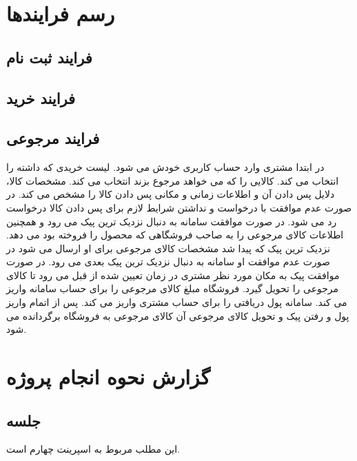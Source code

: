 \documentclass[12pt,a4paper]{article}
\begin{document}
\maketitle
\pagebreak
\tableofcontents
\pagebreak
\listoffigures
\pagebreak
\normalsize	



\pagebreak
\section{رسم فرایندها} \label{section.function}

\subsection{فرایند ثبت نام} \label{section.function.register}


\subsection{فرایند خرید} \label{section.function.buy}


\subsection{فرایند مرجوعی} \label{section.function.return}

در ابتدا مشتری وارد حساب کاربری خودش می شود. لیست خریدی که داشته را انتخاب می کند. کالایی را که می خواهد مرجوع بزند انتخاب می کند. مشخصات کالا، دلایل پس دادن آن و اطلاعات زمانی و مکانی پس دادن کالا را مشخص می کند. در صورت عدم موافقت با درخواست و نداشتن شرایط لازم برای پس دادن کالا درخواست رد می شود. در صورت موافقت سامانه به دنبال نزدیک ترین پیک می رود و همچنین اطلاعات کالای مرجوعی را به صاحب فروشگاهی که محصول را فروخته بود می دهد. نزدیک ترین پیک که پیدا شد مشخصات کالای مرجوعی برای او ارسال می شود در صورت عدم موافقت او سامانه به دنبال نزدیک ترین پیک بعدی می رود. در صورت موافقت پیک به مکان مورد نظر مشتری در زمان تعیین شده از قبل می رود تا کالای مرجوعی را تحویل گیرد. فروشگاه مبلغ کالای مرجوعی را برای حساب سامانه واریز می کند. سامانه پول دریافتی را برای حساب مشتری واریز می کند. پس از اتمام واریز پول و رفتن پیک و تحویل کالای مرجوعی آن کالای مرجوعی به فروشگاه برگردانده می شود.

\section{گزارش نحوه انجام پروژه} \label{section.report}

\subsection{جلسه } \label{section.report.postMortem}
این مطلب مربوط به اسپرینت چهارم است.
\end{document}
